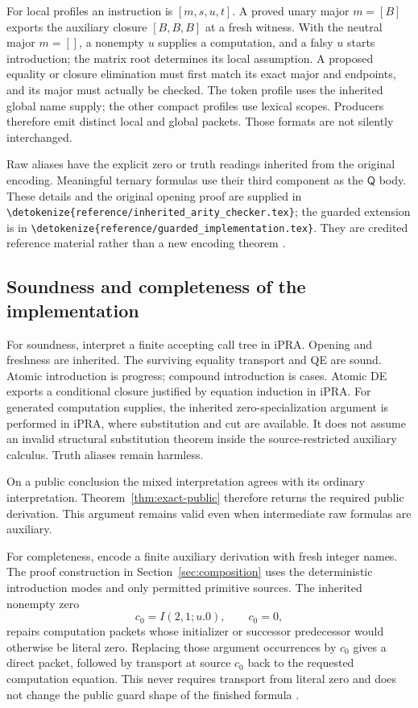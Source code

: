 \documentclass[11pt,letterpaper]{article}
\theoremstyle{definition}\newtheorem{definition}[theorem]{Definition}
\theoremstyle{remark}\newtheorem{remark}[theorem]{Remark}
\newcommand{\Q}{\mathsf Q}
\newcommand{\file}[1]{\expandafter\nolinkurl\expandafter{\detokenize{#1}}}
\begin{document}
For local profiles an instruction is $[m,s,u,t]$. A proved unary major
$m=[B]$ exports the auxiliary closure $[B,B,B]$ at a fresh witness. With
the neutral major $m=[]$, a nonempty $u$ supplies a computation, and a
falsy $u$ starts introduction; the matrix root determines its local
assumption. A proposed equality or closure elimination must first match
its exact major and endpoints, and its major must actually be checked.
The token profile uses the inherited global name supply; the other compact
profiles use lexical scopes. Producers therefore emit distinct local and
global packets. Those formats are not silently interchanged.

Raw aliases have the explicit zero or truth readings inherited from the
original encoding. Meaningful ternary formulas use their third component
as the $\Q$ body. These details and the original opening proof are supplied
in \file{reference/inherited_arity_checker.tex}; the guarded extension is
in \file{reference/guarded_implementation.tex}. They are credited reference
material rather than a new encoding theorem \cite{arity,guarded-impl}.

\subsection{Soundness and completeness of the implementation}

For soundness, interpret a finite accepting call tree in iPRA. Opening and
freshness are inherited. The surviving equality transport and QE are sound.
Atomic introduction is progress; compound introduction is cases. Atomic DE
exports a conditional closure justified by equation induction in iPRA.
For generated computation supplies, the inherited zero-specialization
argument is performed in iPRA, where substitution and cut are available.
It does not assume an invalid structural substitution theorem inside the
source-restricted auxiliary calculus. Truth aliases remain harmless.

On a public conclusion the mixed interpretation agrees with its ordinary
interpretation. Theorem~\ref{thm:exact-public} therefore returns the required
public derivation. This argument remains valid even when intermediate raw
formulas are auxiliary.

For completeness, encode a finite auxiliary derivation with fresh integer
names. The proof construction in Section~\ref{sec:composition} uses the
deterministic introduction modes and only permitted primitive sources.
The inherited nonempty zero
\[
c_0=I(2,1;u.0),\qquad c_0=0,
\]
repairs computation packets whose initializer or successor predecessor
would otherwise be literal zero. Replacing those argument occurrences by
$c_0$ gives a direct packet, followed by transport at source $c_0$ back to
the requested computation equation. This never requires transport from
literal zero and does not change the public guard shape of the finished
formula \cite{source,arity}.
\end{document}
